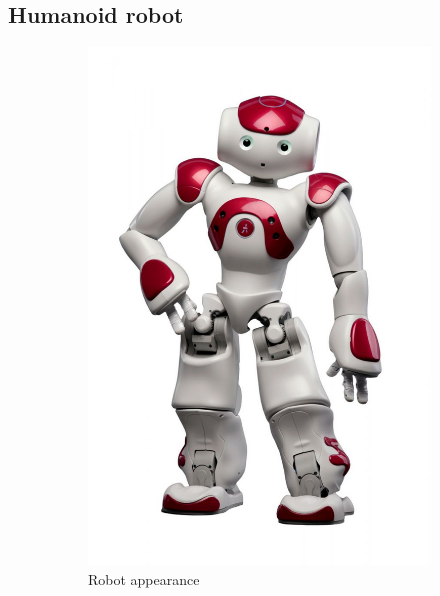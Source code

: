\subsection{Humanoid robot}
\label{ssec:humanoid}
\begin{figure}[H]
\centering
\begin{subfigure}[b]{0.25\textwidth}
\includegraphics[width=\textwidth]{assets/nao_image1.jpg}
\caption{Robot appearance}
\label{fig:naojoint}
\end{subfigure}
\begin{subfigure}[b]{0.25\textwidth}

\end{subfigure}
\end{figure}
